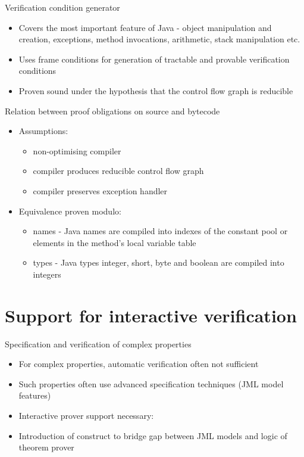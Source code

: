 \documentclass[final,nocolorBG,a4,mobius,nototal,pdf,slideColor]{prosper}
\begin{document}
\begin{slide}{Verification condition generator}
\begin{itemize}
 \item Covers the most important feature of 
 Java - object manipulation and creation, exceptions, 
method invocations, arithmetic, stack manipulation etc.
 
 \item Uses frame conditions for generation of tractable and provable
verification conditions
 \item Proven sound under the hypothesis that the control flow graph is reducible
\end{itemize}
\end{slide}

 
\begin{slide}{Relation between proof obligations on source and bytecode}
\begin{itemize}
\item Assumptions:
 \begin{itemize}
 \item non-optimising compiler 
 \item compiler produces reducible control flow graph
 \item compiler preserves exception handler
 \end{itemize}

\item Equivalence proven modulo:
 \begin{itemize}
 \item names - Java names are compiled into indexes of the constant pool or elements in the method's local variable table
 
 \item types - Java types integer, short, byte and boolean are
 compiled into integers
 
 \end{itemize}
\end{itemize}
\end{slide}

\part{Support for interactive verification}

\begin{slide}{Specification and verification of complex properties}
\begin{itemize}
\item For complex properties, automatic verification often not
sufficient 
\item Such properties often use advanced specification techniques
(JML model features)
\item Interactive prover support necessary: 
\item Introduction of  construct to bridge gap between
JML models and logic of theorem prover
\end{itemize}
\end{slide}
\end{document}
